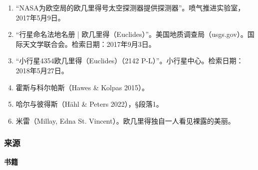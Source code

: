 \begin{enumerate}
\item “NASA为欧空局的欧几里得号太空探测器提供探测器”。喷气推进实验室，2017年5月9日。  
\item “行星命名法地名册 | 欧几里得（Euclides）”。美国地质调查局（usgs.gov）。国际天文学联合会。检索日期：2017年9月3日。  
\item “小行星4354欧几里得（Euclides）（2142 P-L）”。小行星中心。检索日期：2018年5月27日。  
\item 霍斯与科尔帕斯（Hawes & Kolpas 2015）。  
\item 哈尔与彼得斯（Hähl & Peters 2022），§段落1。  
\item 米雷（Millay, Edna St. Vincent）。欧几里得独自一人看见裸露的美丽。
\end{enumerate}
\subsubsection{来源}  
\textbf{书籍}  
